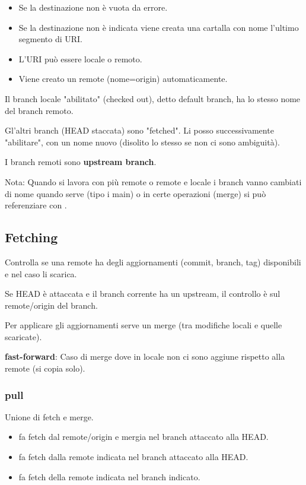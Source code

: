 
\begin{itemize}
	\item Se la destinazione non è vuota da errore.
	\item Se la destinazione non è indicata viene creata una cartalla con nome l'ultimo segmento di URI.
	\item L'URI può essere locale o remoto.
	\item Viene creato un remote (nome=origin) automaticamente.
\end{itemize}

Il branch locale "abilitato" (checked out), detto default branch, ha lo stesso nome del branch remoto.

\medskip

Gl'altri branch (HEAD staccata) sono "fetched". Li posso successivamente "abilitare", con un nome nuovo (disolito lo stesso se non ci sono ambiguità).



\medskip

I branch remoti sono \textbf{upstream branch}.

\bigskip

Nota: Quando si lavora con più remote o remote e locale i branch vanno cambiati di nome quando serve (tipo i main) o in certe operazioni (merge) si può referenziare con .

\subsection{Fetching}
Controlla se una remote ha degli aggiornamenti (commit, branch, tag) disponibili e nel caso li scarica.


Se HEAD è attaccata e il branch corrente ha un upstream, il controllo è sul remote/origin del branch.


Per applicare gli aggiornamenti serve un merge (tra modifiche locali e quelle scaricate).

\textbf{fast-forward}: Caso di merge dove in locale non ci sono aggiune rispetto alla remote (si copia solo).

\subsubsection{pull}
Unione di fetch e merge.
\begin{itemize}
	\item {} fa fetch dal remote/origin e mergia nel branch attaccato alla HEAD.
	\item {} fa fetch dalla remote indicata nel branch attaccato alla HEAD.
	\item {} fa fetch della remote indicata nel branch indicato.
\end{itemize}

